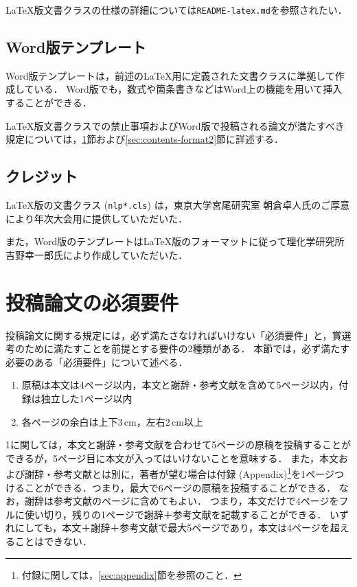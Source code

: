 \documentclass[
  platex, dvipdfmx,  %
]{nlp2024}
\newcommand{\code}[1]{\texttt{#1}}
\begin{document}
LaTeX版文書クラスの仕様の詳細については\code{README-latex.md}を参照されたい．


\subsection{Word版テンプレート}
Word版テンプレートは，前述のLaTeX用に定義された文書クラスに準拠して作成している．
Word版でも，数式や箇条書きなどはWord上の機能を用いて挿入することができる．

LaTeX版文書クラスでの禁止事項およびWord版で投稿される論文が満たすべき規定については，\ref{sec:contents-format1}節および\ref{sec:contents-format2}節に詳述する．


\subsection{クレジット}
LaTeX版の文書クラス (\code{nlp*.cls}) は，東京大学宮尾研究室 朝倉卓人氏のご厚意により年次大会用に提供していただいた．

また，Word版のテンプレートはLaTeX版のフォーマットに従って理化学研究所 吉野幸一郎氏により作成していただいた．




\section{投稿論文の必須要件}
\label{sec:contents-format1}

投稿論文に関する規定には，必ず満たさなければいけない「必須要件」と，賞選考のために満たすことを前提とする要件の2種類がある．
本節では，必ず満たす必要のある「必須要件」について述べる．

\begin{enumerate}
\item 原稿は本文は4ページ以内，本文と謝辞・参考文献を含めて5ページ以内，付録は独立した1ページ以内
\item 各ページの余白は上下3\,cm，左右2\,cm以上
\end{enumerate}

1に関しては，本文と謝辞・参考文献を合わせて5ページの原稿を投稿することができるが，5ページ目に本文が入ってはいけないことを意味する．
また，本文および謝辞・参考文献とは別に，著者が望む場合は付録 (Appendix)\footnote{付録に関しては，\ref{sec:appendix}節を参照のこと．}を1ページつけることができる．つまり，最大で6ページの原稿を投稿することができる．
なお，謝辞は参考文献のページに含めてもよい．
つまり，本文だけで4ページをフルに使い切り，残りの1ページで謝辞＋参考文献を記載することができる．
いずれにしても，本文＋謝辞＋参考文献で最大5ページであり，本文は4ページを超えることはできない．
\end{document}
